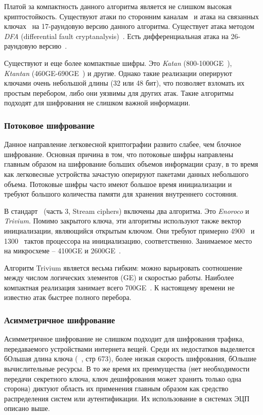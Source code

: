 Платой за компактность данного алгоритма является не слишком высокая криптостойкость. Существуют атаки по сторонним каналам~\cite{src40,src41} и атака на связанных ключах~\cite{src42} на 17-раундовую версию данного алгоритма. Существует атака методом \textit{DFA} (differential fault cryptanalysis)~\cite{src43}. Есть дифференциальная атака на 26-раундовую версию~\cite{src44}.

Существуют и еще более компактные шифры. Это \textit{Katan} (800-1000GE~\cite{src45}), \textit{Ktantan} (460GE-690GE~\cite{src45}) и другие. Однако такие реализации оперируют ключами очень небольшой длины (32 или 48 бит), что позволяет взломать их простым перебором, либо они уязвимы для других атак. Такие алгоритмы подходят для шифрования не слишком важной информации.

\subsubsection{Потоковое шифрование}

Данное направление легковесной криптографии развито слабее, чем блочное шифрование. Основная причина в том, что потоковые шифры направлены главным образом на шифрование больших объемов информации сразу, в то время как легковесные устройства зачастую оперируют пакетами данных небольшого объема. Потоковые шифры часто имеют большое время инициализации и требуют большого количества памяти для хранения внутреннего состояния.

В стандарт~\cite{src26} (часть 3, Stream ciphers) включены два алгоритма. Это \textit{Enoroco} и \textit{Trivium}. Помимо закрытого ключа, эти алгоритмы используют также вектор инициализации, являющийся открытым ключом. Они требуют примерно 4900~\cite{src46} и 1300~\cite{src47} тактов процессора на инициализацию, соответственно. Занимаемое место на микросхеме – 4100GE и 2600GE~\cite{src48}.

Алгоритм Trivium является весьма гибким: можно варьировать соотношение между числом логических элементов (GE) и скоростью работы. Наиболее компактная реализация занимает всего 700GE~\cite{src49}. К настоящему времени не известно атак быстрее полного перебора.

\subsubsection{Асимметричное шифрование}

Асимметричное шифрование не слишком подходит для шифрования трафика, передаваемого устройствами интернета вещей. Среди их недостатков выделяется бОльшая длина ключа (~\cite{src50}, стр 673), более низкая скорость шифрования, бОльшие вычислительные ресурсы. В то же время их преимущества (нет необходимости передачи секретного ключа, ключ дешифрования может хранить только одна сторона) диктуют область их применения главным образом как средство распределения систем или аутентификации. Их использование в системах ЭЦП описано выше.

